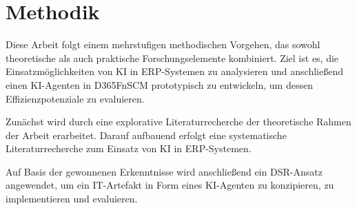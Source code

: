\section{Methodik}
Diese Arbeit folgt einem mehrstufigen methodischen Vorgehen, das sowohl theoretische als auch praktische Forschungselemente kombiniert. Ziel ist es, die Einsatzmöglichkeiten von \ac{KI} in \ac{ERP}-Systemen zu analysieren und anschließend einen \ac{KI}-Agenten in \ac{D365FnSCM} prototypisch zu entwickeln, um dessen Effizienzpotenziale zu evaluieren.

Zunächst wird durch eine explorative Literaturrecherche der theoretische Rahmen der Arbeit erarbeitet. Darauf aufbauend erfolgt eine systematische Literaturrecherche zum Einsatz von \ac{KI} in \ac{ERP}-Systemen.

Auf Basis der gewonnenen Erkenntnisse wird anschließend ein \ac{DSR}-Ansatz angewendet, um ein IT-Artefakt in Form eines \ac{KI}-Agenten zu konzipieren, zu implementieren und evaluieren.



